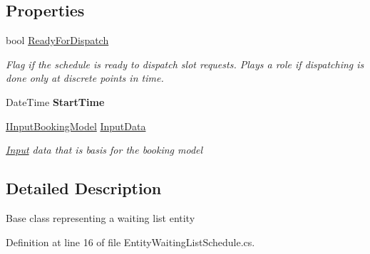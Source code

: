 \subsection*{Properties}
\begin{DoxyCompactItemize}
\item 
bool \hyperlink{class_general_health_care_elements_1_1_booking_models_1_1_entity_waiting_list_schedule_a2ffd912b953b0ce1db8e950e50ecee36}{Ready\+For\+Dispatch}
\begin{DoxyCompactList}\small\item\em Flag if the schedule is ready to dispatch slot requests. Plays a role if dispatching is done only at discrete points in time. \end{DoxyCompactList}\item 
Date\+Time {\bfseries Start\+Time}\hypertarget{class_general_health_care_elements_1_1_booking_models_1_1_entity_waiting_list_schedule_a145f33feb8fad3ba3a39f3d7ed3eb64d}{}\label{class_general_health_care_elements_1_1_booking_models_1_1_entity_waiting_list_schedule_a145f33feb8fad3ba3a39f3d7ed3eb64d}

\item 
\hyperlink{interface_general_health_care_elements_1_1_department_models_1_1_outpatient_1_1_i_input_booking_model}{I\+Input\+Booking\+Model} \hyperlink{class_general_health_care_elements_1_1_booking_models_1_1_entity_waiting_list_schedule_ac4022d99c7ca6dec1e77b2fba2f68e3f}{Input\+Data}
\begin{DoxyCompactList}\small\item\em \hyperlink{namespace_general_health_care_elements_1_1_input}{Input} data that is basis for the booking model \end{DoxyCompactList}\end{DoxyCompactItemize}


\subsection{Detailed Description}
Base class representing a waiting list entity 



Definition at line 16 of file Entity\+Waiting\+List\+Schedule.\+cs.



